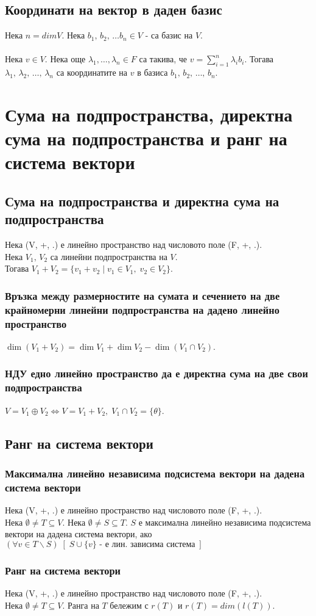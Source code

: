 \documentclass[12pt]{article}
\begin{document}
    \subsection{Координати на вектор в даден базис}
    Нека \(n = dimV\). Нека \(b_1, \, b_2, \, \dots b_n \in V\) - са базис на \(V\). \\\\
    Нека \(v \in V\). Нека още \(\lambda_1, \dots, \lambda_n \in F\) са такива,
    че \(v = \displaystyle\sum_{i=1}^{n} \lambda_i b_i\).
    Тогава \(\lambda_1, \, \lambda_2, \, \dots, \, \lambda_n\) са координатите на \(v\) в базиса \(b_1, \, b_2, \, \dots, \, b_n\).
    \section{Сума на подпространства, директна сума на подпространства и ранг на система вектори}
    \subsection{Сума на подпространства и директна сума на подпространства}
    Нека (V, +, .) е линейно пространство над числовото поле (F, +, .).\\
    Нека \(V_1, \, V_2\) са линейни подпространства на \(V\). \\
    Тогава \(V_1 + V_2 = \{ v_1 + v_2 \; | \; v_1 \in V_1, \; v_2 \in V_2 \}\).
    \subsubsection{Връзка между размерностите на сумата и сечението на две крайномерни линейни подпространства на дадено линейно пространство}
    \(\dim{(V_1 + V_2)} = \dim{V_1} + \dim{V_2} - \dim{(V_1 \cap V_2)}\).
    \subsubsection{НДУ едно линейно пространство да е директна сума на две свои подпространства}
    \(V = V_1 \oplus V_2 \iff V = V_1 + V_2, \; V_1 \cap V_2 = \{ \theta \}\).
    \subsection{Ранг на система вектори}
    \subsubsection{Максимална линейно независима подсистема вектори на дадена система вектори}
    Нека (V, +, .) е линейно пространство над числовото поле (F, +, .).\\
    Нека \(\emptyset \neq T \subseteq V\). Нека \(\emptyset \neq S \subseteq T\).
    \(S\) е максимална линейно независима подсистема вектори на дадена система вектори, ако \\
    \((\forall v \in T \backslash S) \; [\; S \cup \{v\} \text{ - е лин. зависима система} \;] \)
    \subsubsection{Ранг на система вектори}
    Нека (V, +, .) е линейно пространство над числовото поле (F, +, .).\\
    Нека \(\emptyset \neq T \subseteq V\). Ранга на \(T\) бележим с \(r(T)\) и \(r(T) = dim(l(T))\).
\end{document}
